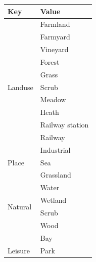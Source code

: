 \documentclass[sn-basic]{sn-jnl}%
\begin{document}
{\begin{appendices}
\begin{table}
 
    \begin{tabular}{ll}
    \toprule
    \multicolumn{1}{l}{\textbf{Key}} & \multicolumn{1}{l}{\textbf{Value}} \\ \midrule
    \multirow{11}{*}{Landuse}        & Farmland                                                            \\
                                     & Farmyard                           \\
                                     & Vineyard                           \\
                                     & Forest                             \\
                                     & Grass                              \\
                                     & Scrub                              \\
                                     & Meadow                             \\
                                     & Heath                              \\
                                     & Railway station                    \\
                                     & Railway                            \\
                                     & Industrial                         \\ \midrule
    Place                            & Sea                                \\ \midrule
    \multirow{6}{*}{Natural}         & Grassland                         
                               \\
                               & Water                             
                               \\
                               & Wetland                          
                               \\
                               & Scrub                            
                               \\
                               & Wood                          
                               \\
                               & Bay                                
                               \\ \midrule
    Leisure                    & Park                               
    \\ \midrule

\end{tabular}
\end{table}
\end{appendices}}
\end{document}
